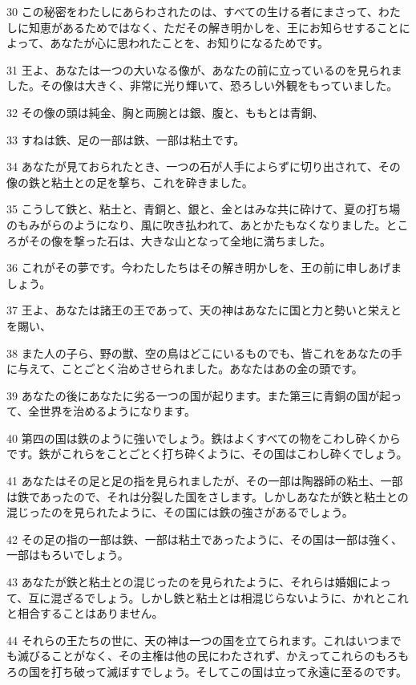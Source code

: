 \par 30 この秘密をわたしにあらわされたのは、すべての生ける者にまさって、わたしに知恵があるためではなく、ただその解き明かしを、王にお知らせすることによって、あなたが心に思われたことを、お知りになるためです。
\par 31 王よ、あなたは一つの大いなる像が、あなたの前に立っているのを見られました。その像は大きく、非常に光り輝いて、恐ろしい外観をもっていました。
\par 32 その像の頭は純金、胸と両腕とは銀、腹と、ももとは青銅、
\par 33 すねは鉄、足の一部は鉄、一部は粘土です。
\par 34 あなたが見ておられたとき、一つの石が人手によらずに切り出されて、その像の鉄と粘土との足を撃ち、これを砕きました。
\par 35 こうして鉄と、粘土と、青銅と、銀と、金とはみな共に砕けて、夏の打ち場のもみがらのようになり、風に吹き払われて、あとかたもなくなりました。ところがその像を撃った石は、大きな山となって全地に満ちました。
\par 36 これがその夢です。今わたしたちはその解き明かしを、王の前に申しあげましょう。
\par 37 王よ、あなたは諸王の王であって、天の神はあなたに国と力と勢いと栄えとを賜い、
\par 38 また人の子ら、野の獣、空の鳥はどこにいるものでも、皆これをあなたの手に与えて、ことごとく治めさせられました。あなたはあの金の頭です。
\par 39 あなたの後にあなたに劣る一つの国が起ります。また第三に青銅の国が起って、全世界を治めるようになります。
\par 40 第四の国は鉄のように強いでしょう。鉄はよくすべての物をこわし砕くからです。鉄がこれらをことごとく打ち砕くように、その国はこわし砕くでしょう。
\par 41 あなたはその足と足の指を見られましたが、その一部は陶器師の粘土、一部は鉄であったので、それは分裂した国をさします。しかしあなたが鉄と粘土との混じったのを見られたように、その国には鉄の強さがあるでしょう。
\par 42 その足の指の一部は鉄、一部は粘土であったように、その国は一部は強く、一部はもろいでしょう。
\par 43 あなたが鉄と粘土との混じったのを見られたように、それらは婚姻によって、互に混ざるでしょう。しかし鉄と粘土とは相混じらないように、かれとこれと相合することはありません。
\par 44 それらの王たちの世に、天の神は一つの国を立てられます。これはいつまでも滅びることがなく、その主権は他の民にわたされず、かえってこれらのもろもろの国を打ち破って滅ぼすでしょう。そしてこの国は立って永遠に至るのです。
